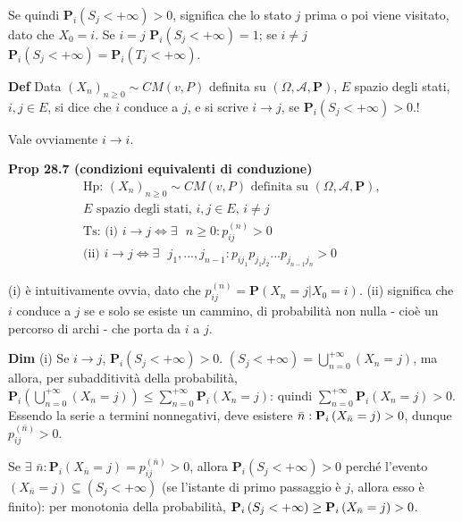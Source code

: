 \documentclass{article}
\begin{document}
Se quindi $\mathbf{P}_{i}\left( S_{j}<+\infty \right) >0$, significa che lo
stato $j$ prima o poi viene visitato, dato che $X_{0}=i$. Se $i=j$ $\mathbf{P%
}_{i}\left( S_{j}<+\infty \right) =1$; se $i\neq j$ $\mathbf{P}_{i}\left(
S_{j}<+\infty \right) =\mathbf{P}_{i}\left( T_{j}<+\infty \right) $.

\textbf{Def} Data $\left( X_{n}\right) _{n\geq 0}\sim CM\left( v,P\right) $
definita su $\left( \Omega ,\mathcal{A},\mathbf{P}\right) $, $E$ spazio
degli stati, $i,j\in E$, si dice che $i$ conduce a $j$, e si scrive $%
i\rightarrow j$, se $\mathbf{P}_{i}\left( S_{j}<+\infty \right) >0$.!

Vale ovviamente $i\rightarrow i$.

\textbf{Prop 28.7 (condizioni equivalenti di conduzione)}%
\begin{gather*}
\text{Hp}\text{: }\left( X_{n}\right) _{n\geq 0}\sim CM\left( v,P\right) 
\text{ definita su }\left( \Omega ,\mathcal{A},\mathbf{P}\right) \text{, } \\
E\text{ spazio degli stati, }i,j\in E\text{, }i\neq j \\
\text{Ts}\text{: (i) }i\rightarrow j\Longleftrightarrow \exists \text{ }%
n\geq 0:p_{ij}^{\left( n\right) }>0 \\
\text{(ii) }i\rightarrow j\Longleftrightarrow \exists \text{ }%
j_{1},...,j_{n-1}:p_{ij_{1}}p_{j_{1}j_{2}}...p_{j_{n-1}j_{n}}>0
\end{gather*}

(i) \`{e} intuitivamente ovvia, dato che $p_{ij}^{\left( n\right) }=\mathbf{P%
}\left( X_{n}=j|X_{0}=i\right) $. (ii) significa che $i$ conduce a $j$ se e
solo se esiste un cammino, di probabilit\`{a} non nulla - cio\`{e} un
percorso di archi - che porta da $i$ a $j$.

\textbf{Dim} (i) Se $i\rightarrow j$, $\mathbf{P}_{i}\left( S_{j}<+\infty
\right) >0$. $\left( S_{j}<+\infty \right) =\bigcup_{n=0}^{+\infty }\left(
X_{n}=j\right) $, ma allora, per subadditivit\`{a} della probabilit\`{a}, $%
\mathbf{P}_{i}\left( \bigcup_{n=0}^{+\infty }\left( X_{n}=j\right) \right)
\leq \sum_{n=0}^{+\infty }\mathbf{P}_{i}\left( X_{n}=j\right) $: quindi $%
\sum_{n=0}^{+\infty }\mathbf{P}_{i}\left( X_{n}=j\right) >0$. Essendo la
serie a termini nonnegativi, deve esistere $\bar{n}:\mathbf{P}_{i}\left( X_{%
\bar{n}}=j\right) >0$, dunque $p_{ij}^{\left( \bar{n}\right) }>0$.

Se $\exists $ $\bar{n}:\mathbf{P}_{i}\left( X_{\bar{n}}=j\right)
=p_{ij}^{\left( \bar{n}\right) }>0$, allora $\mathbf{P}_{i}\left(
S_{j}<+\infty \right) >0$ perch\'{e} l'evento $\left( X_{\bar{n}}=j\right)
\subseteq \left( S_{j}<+\infty \right) $ (se l'istante di primo passaggio 
\`{e} $j$, allora esso \`{e} finito): per monotonia della probabilit\`{a}, $%
\mathbf{P}_{i}\left( S_{j}<+\infty \right) \geq \mathbf{P}_{i}\left( X_{\bar{%
n}}=j\right) >0$.
\end{document}
